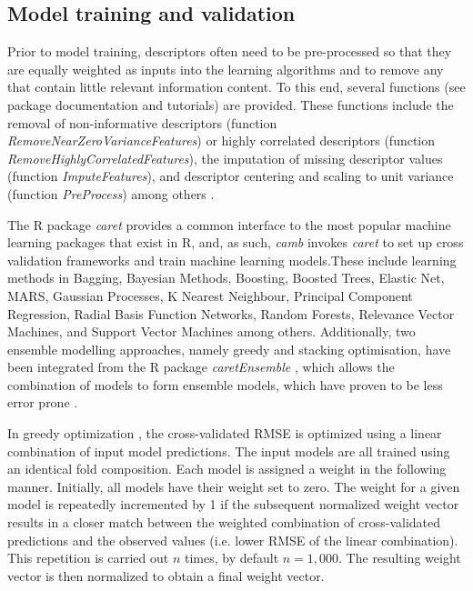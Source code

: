 \documentclass[twoside,a4wide,10pt]{article}
\begin{document}
\subsection{Model training and validation}

Prior to model training, descriptors often need to be pre-processed \citep{andersson} so that they are equally weighted as inputs into the learning algorithms and to remove any that contain little relevant information content.
To this end, several functions (see package documentation and tutorials)
are provided.
These functions include the removal of non-informative descriptors (function {\it RemoveNearZeroVarianceFeatures})
or highly correlated descriptors (function {\it RemoveHighlyCorrelatedFeatures}),
the imputation of missing descriptor values (function {\it ImputeFeatures}),
and descriptor centering and scaling to unit variance (function {\it PreProcess}) among others \citep{Kuhn2013}.

The R package {\it caret} provides a common interface to the most popular machine learning packages that exist in R, and, as such,
{\it camb} invokes {\it caret} to set up cross validation frameworks and
train machine learning models.These include learning methods in Bagging, Bayesian Methods, Boosting, Boosted Trees, Elastic Net, MARS, Gaussian Processes, K Nearest Neighbour, Principal Component Regression, Radial Basis Function Networks, Random Forests, Relevance Vector Machines, and Support Vector Machines among others.
Additionally, two ensemble modelling approaches, namely greedy and stacking optimisation,
have been integrated from the R package {\it caretEnsemble} \citep{caretEnsemble},
which allows the combination of models to form ensemble models, which have proven to be less error prone \citep{cortesCOX}.

In greedy optimization \citep{caruana}, the cross-validated RMSE is optimized using a linear combination of input model predictions. 
The input models are all trained using an identical fold composition.
Each model is assigned a weight in the following manner. 
Initially, all models have their weight set to zero. 
The weight for a given model is repeatedly incremented by 1 if the subsequent normalized weight vector results in a
closer match between the weighted combination of cross-validated predictions and the observed values (i.e. lower RMSE of the linear combination). 
This repetition is carried out $n$ times, by default $n = 1,000$.
The resulting weight vector is then normalized to obtain a final weight vector.
\end{document}
